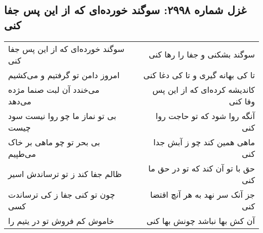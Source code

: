 \begin{center}
\section*{غزل شماره ۲۹۹۸: سوگند خورده‌ای که از این پس جفا کنی}
\label{sec:2998}
\begin{longtable}{l p{0.5cm} r}
سوگند خورده‌ای که از این پس جفا کنی
&&
سوگند بشکنی و جفا را رها کنی
\\
امروز دامن تو گرفتیم و می‌کشیم
&&
تا کی بهانه گیری و تا کی دغا کنی
\\
می‌خندد آن لبت صنما مژده می‌دهد
&&
کاندیشه کرده‌ای که از این پس وفا کنی
\\
بی تو نماز ما چو روا نیست سود چیست
&&
آنگه روا شود که تو حاجت روا کنی
\\
بی بحر تو چو ماهی بر خاک می‌طپیم
&&
ماهی همین کند چو ز آبش جدا کنی
\\
ظالم جفا کند ز تو ترساندش اسیر
&&
حق با تو آن کند که تو در حق ما کنی
\\
چون تو کنی جفا ز کی ترساندت کسی
&&
جز آنک سر نهد به هر آنچ اقتضا کنی
\\
خاموش کم فروش تو در یتیم را
&&
آن کش بها نباشد چونش بها کنی
\\
\end{longtable}
\end{center}
